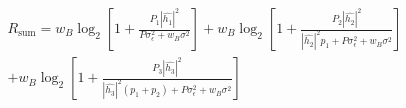 \documentclass[preview]{standalone}
\begin{document}
\begin{align*}
R_{\mathrm{sum}} =  w_B \log_2 \left[1 + \frac{P_1 \left|\hat{h_1}\right|^2}{P \sigma_{\epsilon}^2 + w_B \sigma^2}\right] + w_B \log_2 \left[1 + \frac{P_2 \left|\hat{h_2}\right|^2}{\left|\hat{h_2}\right|^2 p_1 + P \sigma_{\epsilon}^2 + w_B \sigma^2}\right] \\ + w_B \log_2 \left[1 + \frac{P_3 \left|\hat{h_3}\right|^2}{\left|\hat{h_3}\right|^2 (p_1 + p_2) + P \sigma_{\epsilon}^2 + w_B \sigma^2}\right]
\end{align*}
\end{document}
